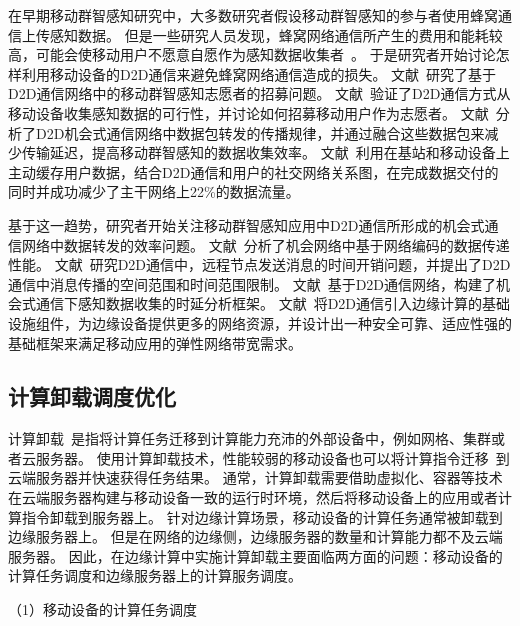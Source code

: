 在早期移动群智感知研究中，大多数研究者假设移动群智感知的参与者使用蜂窝通信上传感知数据。
但是一些研究人员发现，蜂窝网络通信所产生的费用和能耗较高，可能会使移动用户不愿意自愿作为感知数据收集者~\cite{DBLP:conf/globecom/ZhangJLLC16,DBLP:conf/icdcs/XiaoWHHH16}。
于是研究者开始讨论怎样利用移动设备的D2D通信来避免蜂窝网络通信造成的损失。
文献~\cite{DBLP:conf/infocom/KaraliopoulosTK15}研究了基于D2D通信网络中的移动群智感知志愿者的招募问题。
文献~\cite{DBLP:journals/puc/WangLL17}验证了D2D通信方式从移动设备收集感知数据的可行性，并讨论如何招募移动用户作为志愿者。 
文献~\cite{DBLP:journals/tpds/ZhaoMTL15}分析了D2D机会式通信网络中数据包转发的传播规律，并通过融合这些数据包来减少传输延迟，提高移动群智感知的数据收集效率。
文献~\cite{DBLP:journals/cm/BastugBD14}利用在基站和移动设备上主动缓存用户数据，结合D2D通信和用户的社交网络关系图，在完成数据交付的同时并成功减少了主干网络上22\%的数据流量。

基于这一趋势，研究者开始关注移动群智感知应用中D2D通信所形成的机会式通信网络中数据转发的效率问题。
文献~\cite{DBLP:conf/wcnc/QinF13}分析了机会网络中基于网络编码的数据传递性能。
文献~\cite{DBLP:journals/twc/LiW14}研究D2D通信中，远程节点发送消息的时间开销问题，并提出了D2D通信中消息传播的空间范围和时间范围限制。
文献~\cite{DBLP:journals/winet/ZhaoMLT18}基于D2D通信网络，构建了机会式通信下感知数据收集的时延分析框架。
文献~\cite{DBLP:conf/mwcn/OrsiniBL15}将D2D通信引入边缘计算的基础设施组件，为边缘设备提供更多的网络资源，并设计出一种安全可靠、适应性强的基础框架来满足移动应用的弹性网络带宽需求。

\subsection{计算卸载调度优化}

计算卸载~\cite{DBLP:journals/network/MaZZWP13}是指将计算任务迁移到计算能力充沛的外部设备中，例如网格、集群或者云服务器。
使用计算卸载技术，性能较弱的移动设备也可以将计算指令迁移~\cite{DBLP:journals/monet/KumarLLB13}到云端服务器并快速获得任务结果。
通常，计算卸载需要借助虚拟化、容器等技术在云端服务器构建与移动设备一致的运行时环境，然后将移动设备上的应用或者计算指令卸载到服务器上。
针对边缘计算场景，移动设备的计算任务通常被卸载到边缘服务器上。
但是在网络的边缘侧，边缘服务器的数量和计算能力都不及云端服务器。
因此，在边缘计算中实施计算卸载主要面临两方面的问题：移动设备的计算任务调度和边缘服务器上的计算服务调度。

（1）移动设备的计算任务调度

